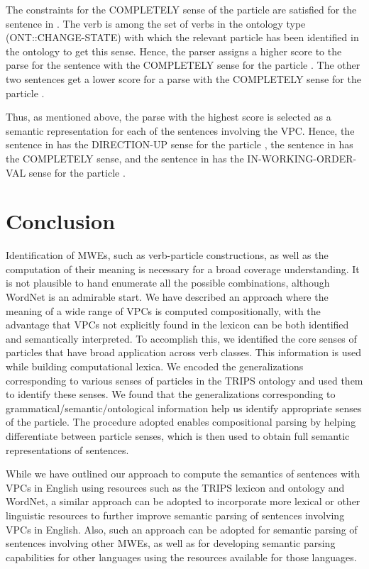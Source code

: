 \documentclass[output=paper
,modfonts
,nonflat]{langsci/langscibook}
\begin{document}
The constraints for the COMPLETELY sense of the particle  are satisfied for the sentence in . The verb  is among the set of verbs in the ontology type (ONT::CHANGE-STATE) with which the relevant particle has been identified in the ontology to get this sense. Hence, the parser assigns a higher score to the parse for the sentence with the COMPLETELY sense for the particle . The other two sentences get a lower score for a parse with the COMPLETELY sense for the particle .

Thus, as mentioned above, the parse with the highest score is selected as a semantic representation for each of the sentences involving the VPC. Hence, the sentence in  has the DIRECTION-UP sense for the particle , the sentence in  has the COMPLETELY sense, and the sentence in  has the IN-WORKING-ORDER-VAL sense for the particle .

\section{Conclusion } \label{bha:sec:conclusions}
Identification of MWEs, such as verb-particle constructions, as well as the computation of their meaning is necessary for a broad coverage understanding. It is not plausible to hand enumerate all the possible combinations, although WordNet is an admirable start.  We have described an approach where the meaning of a wide range of VPCs is computed compositionally, with the advantage that VPCs not explicitly found in the lexicon can be both identified and semantically interpreted. To accomplish this, we identified the core senses of particles that have broad application across verb classes. This information is used while building computational lexica. We encoded the generalizations corresponding to various senses of particles in the TRIPS ontology and used them to identify these senses. We found that the generalizations corresponding to grammatical/semantic/ontological information help us identify appropriate senses of the particle. The procedure adopted enables compositional parsing by helping differentiate between particle senses, which is then used to obtain full semantic representations of sentences.

While we have outlined our approach to compute the semantics of sentences with VPCs in English using resources such as the TRIPS lexicon and ontology and WordNet, a similar approach can be adopted to incorporate more lexical or other linguistic resources to further improve semantic parsing of sentences involving VPCs in English. Also, such an approach can be adopted for semantic parsing of sentences involving other MWEs, as well as for developing semantic parsing capabilities for other languages using the resources available for those languages.  
\end{document}
